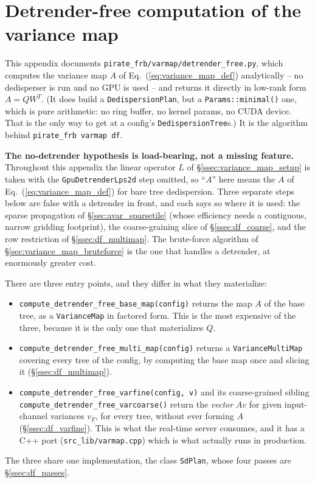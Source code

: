 \documentclass{article}
\numberwithin{equation}{section}   %
\begin{document}
\clearpage

\section{Detrender-free computation of the variance map}
\label{sec:analytic_variance}

This appendix documents \verb|pirate_frb/varmap/detrender_free.py|, which computes the
variance map $A$ of Eq.\ (\ref{eq:variance_map_def}) analytically -- no dedisperser is run and
no GPU is used -- and returns it directly in low-rank form $A = QW^T$. (It does build a
{\tt DedispersionPlan}, but a {\tt Params::minimal()} one, which is pure arithmetic: no
ring buffer, no kernel params, no CUDA device. That is the only way to get at a config's
{\tt DedispersionTree}s.) It is the algorithm behind {\tt pirate\_frb varmap df}.

{\bf The no-detrender hypothesis is load-bearing, not a missing feature.} Throughout this
appendix the linear operator $L$ of \S\ref{ssec:variance_map_setup} is taken with the
{\tt GpuDetrenderLps2d} step omitted, so ``$A$'' here means the $A$ of
Eq.\ (\ref{eq:variance_map_def}) for bare tree dedispersion. Three separate steps below are
false with a detrender in front, and each says so where it is used: the sparse propagation of
\S\ref{sec:avar_sparsetile} (whose efficiency needs a contiguous, narrow gridding footprint),
the coarse-graining slice of \S\ref{ssec:df_coarse}, and the row restriction of
\S\ref{ssec:df_multimap}. The brute-force algorithm of \S\ref{sec:variance_map_bruteforce} is
the one that handles a detrender, at enormously greater cost.

There are three entry points, and they differ in what they materialize:
\begin{itemize}
\item \verb|compute_detrender_free_base_map(config)| returns the map $A$ of the base tree, as
a \verb|VarianceMap| in factored form. This is the most expensive of the three, because it is
the only one that materializes $Q$.
\item \verb|compute_detrender_free_multi_map(config)| returns a \verb|VarianceMultiMap|
covering every tree of the config, by computing the base map once and slicing it
(\S\ref{ssec:df_multimap}).
\item \verb|compute_detrender_free_varfine(config, v)| and its coarse-grained sibling
\verb|compute_detrender_free_varcoarse()| return the {\em vector} $Av$ for given input-channel
variances $v_F$, for every tree, without ever forming $A$ (\S\ref{ssec:df_varfine}). This is
what the real-time server consumes, and it has a C++ port
(\verb|src_lib/varmap.cpp|) which is what actually runs in production.
\end{itemize}
The three share one implementation, the class \verb|SdPlan|, whose four passes are
\S\ref{ssec:df_passes}.
\end{document}
